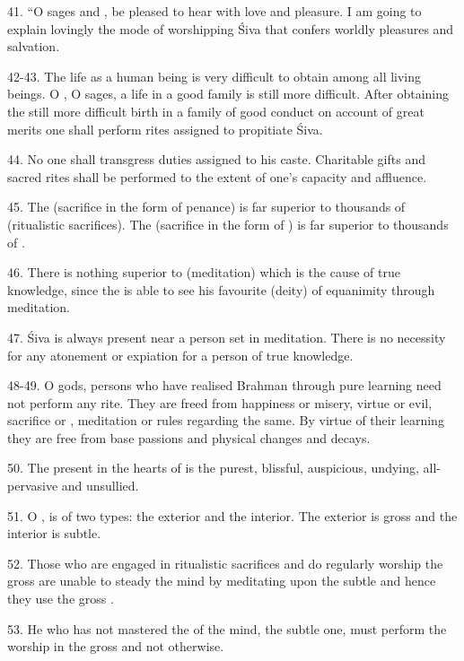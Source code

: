 41. “O sages and , be pleased to hear with love and pleasure. I am
going to explain lovingly the mode of worshipping Śiva that confers worldly
pleasures and salvation.

42-43. The life as a human being is very difficult to obtain among all living
beings. O , O sages, a life in a good family is still more difficult.
After obtaining the still more difficult birth in a  family of
good conduct on account of great merits one shall perform rites assigned to
propitiate Śiva.

44. No one shall transgress duties assigned to his caste. Charitable gifts and
sacred rites shall be performed to the extent of one’s capacity and affluence.

45. The  (sacrifice in the form of penance) is far superior to
thousands of  (ritualistic sacrifices). The 
(sacrifice in the form of ) is far superior to thousands of
.

46. There is nothing superior to  (meditation) which is
the cause of true knowledge, since the  is able to see his favourite
(deity) of equanimity through meditation.

47. Śiva is always present near a person set in meditation. There is no
necessity for any atonement or expiation for a person of true knowledge.

48-49. O gods, persons who have realised Brahman through pure learning need not
perform any rite. They are freed from happiness or misery, virtue or evil,
sacrifice or , meditation or rules regarding the same. By virtue of
their learning they are free from base passions and physical changes and decays.

50. The  present in the hearts of  is the purest, blissful,
auspicious, undying, all-pervasive and unsullied.

51. O ,  is of two types: the exterior and the interior.
The exterior is gross and the interior is subtle.

52. Those who are engaged in ritualistic sacrifices and do regularly worship
the gross  are unable to steady the mind by meditating upon the subtle
and hence they use the gross .

53. He who has not mastered the  of the mind, the subtle one, must
perform the worship in the gross  and not otherwise.

